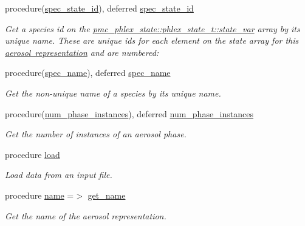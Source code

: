 \begin{DoxyCompactItemize}
procedure(\mbox{\hyperlink{interfacepmc__aero__rep__data_1_1spec__state__id}{spec\+\_\+state\+\_\+id}}), deferred \mbox{\hyperlink{structpmc__aero__rep__data_1_1aero__rep__data__t_a6dcaf48caeaaed60aa065a0fac6c7ffc}{spec\+\_\+state\+\_\+id}}
\begin{DoxyCompactList}\small\item\em Get a species id on the {\ttfamily \mbox{\hyperlink{structpmc__phlex__state_1_1phlex__state__t_a78835cb552d483ebbfc7a6bc6f756918}{pmc\+\_\+phlex\+\_\+state\+::phlex\+\_\+state\+\_\+t\+::state\+\_\+var}}} array by its unique name. These are unique ids for each element on the state array for this \mbox{\hyperlink{phlex_aero_rep}{aerosol representation}} and are numbered\+: \end{DoxyCompactList}\item 
procedure(\mbox{\hyperlink{interfacepmc__aero__rep__data_1_1spec__name}{spec\+\_\+name}}), deferred \mbox{\hyperlink{structpmc__aero__rep__data_1_1aero__rep__data__t_a2bade2ef633a4b9958b46d816cbfb07a}{spec\+\_\+name}}
\begin{DoxyCompactList}\small\item\em Get the non-\/unique name of a species by its unique name. \end{DoxyCompactList}\item 
procedure(\mbox{\hyperlink{interfacepmc__aero__rep__data_1_1num__phase__instances}{num\+\_\+phase\+\_\+instances}}), deferred \mbox{\hyperlink{structpmc__aero__rep__data_1_1aero__rep__data__t_a33d2542999a12af817d042cd3e9cb058}{num\+\_\+phase\+\_\+instances}}
\begin{DoxyCompactList}\small\item\em Get the number of instances of an aerosol phase. \end{DoxyCompactList}\item 
procedure \mbox{\hyperlink{structpmc__aero__rep__data_1_1aero__rep__data__t_a4c05bf62e74f1aa5ae8b59071e048fce}{load}}
\begin{DoxyCompactList}\small\item\em Load data from an input file. \end{DoxyCompactList}\item 
procedure \mbox{\hyperlink{structpmc__aero__rep__data_1_1aero__rep__data__t_a5580423f89430ccd099fb2e443f9ac6b}{name}} =$>$ \mbox{\hyperlink{namespacepmc__aero__rep__data_a20e6255c5249c9fc6691e305676bb47c}{get\+\_\+name}}
\begin{DoxyCompactList}\small\item\em Get the name of the aerosol representation. \end{DoxyCompactList}\item 

\end{DoxyCompactItemize}
